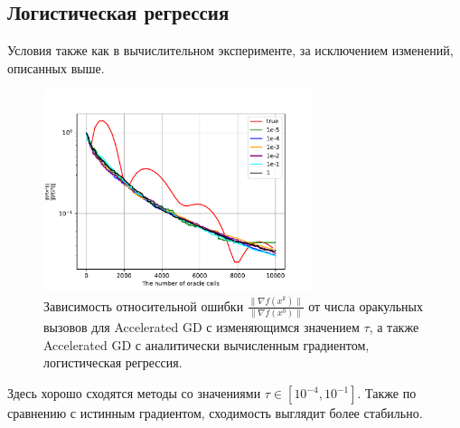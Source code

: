 \documentclass{article}
\begin{document}
\subsection{Логистическая регрессия}
Условия также как в вычислительном эксперименте, за исключением изменений, описанных выше.
\begin{figure}[!htbp]
\centering
  \includegraphics[width=0.7\textwidth]{../figures/Error_analysis_logreg_sigma=1e-6.pdf}
 \caption{Зависимость относительной ошибки $\frac{\|\nabla f(x^k)\|}{\|\nabla f(x^0)\|}$ от числа оракульных вызовов для Accelerated GD с изменяющимся значением $\tau$, а также Accelerated GD с аналитически вычисленным градиентом, логистическая регрессия.}
  \label{fig:non-stochastic_logreg}
\end{figure}
Здесь хорошо сходятся методы со значениями $\tau \in [10^{-4}, 10^{-1}]$. Также по сравнению с истинным градиентом, сходимость выглядит более стабильно.


\end{document}
